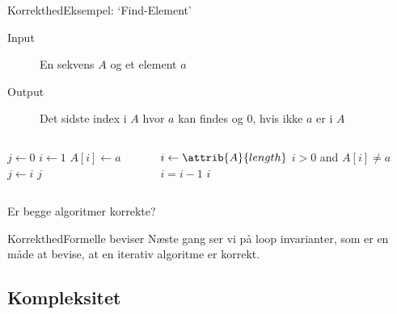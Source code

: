 \documentclass[aspectratio=1610]{beamer}
\begin{document}
\begin{frame}{Korrekthed}{Eksempel: `Find-Element'}
    \begin{description}
        \item[Input] En sekvens $A$ og et element $a$
        \item[Output] Det \alert{sidste} index i $A$ hvor $a$ kan findes og 0,
            hvis ikke $a$ er i $A$
    \end{description}

    \pause
    \begin{columns}

        \begin{codebox}
            \li $j \gets 0$
            \li \For $i \gets 1$ \To {} \Do
                \li \If $A[i] \gets a$ \Then
                    \li $j \gets i$
                \End
            \End
            \li \Return $j$
        \end{codebox}


        \begin{codebox}
            \li $i \gets \attrib{A}{length}$
            \li \While $i > 0$ and $A[i] \neq a$ \Then
                \li $i = i - 1$
            \End
            \li \Return $i$
        \end{codebox}

    \end{columns}

    \medskip
    Er begge algoritmer korrekte? 
\end{frame}

\begin{frame}{Korrekthed}{Formelle beviser}
    Næste gang ser vi på \alert{loop invarianter}, som er en måde at bevise, at
    en iterativ algoritme er korrekt.
\end{frame}

\subsection{Kompleksitet}
\end{document}
